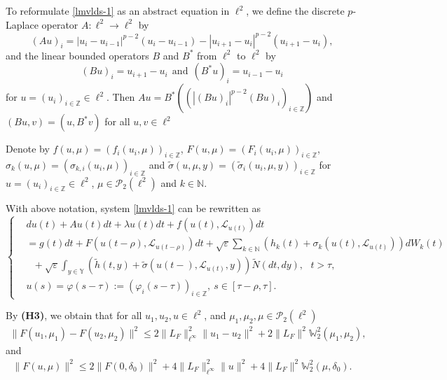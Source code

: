 \documentclass[11pt]{article}
\numberwithin{equation}{section}
\theoremstyle{plain}
\begin{document}
 To reformulate \eqref{lmvlds-1} as an abstract equation in $\ell^2$,
  we  define the discrete $p$-Laplace operator $A: \ell^2 \to \ell^2 $ by
 $$ (Au)_i = |u_{i}  - u_{i-1}|^{p-2} \left( u_{i}  - u_{i-1} \right)
             - |u_{i+1} - u_{i}|^{p-2} \left( u_{i+1}  - u_i \right),
 $$
  and the  linear  bounded operators $B$ and $B^*$ from $\ell^2$ to $\ell^2 $ by
 $$(Bu)_i = u_{i+1} - u_i \ \ \text{and}\ \  (B^*u)_i = u_{i-1} - u_{i}$$
 for $u=(u_i)_{i \in \mathbb{Z} } \in \ell^2$.
 Then
 $ Au= B^*
                        \left( \left( |(Bu)_i|^{p-2} (Bu)_i \right)_{i \in \mathbb{Z}}
                        \right)
 $
 and
 $(Bu, v) = (u, B^*v)$
 for all $u,v \in \ell^2$

 Denote by
 $f(u,\mu) = (f_i(u_i, \mu ))_{i \in \mathbb{Z}}$,
 $F(u,\mu) = (F_i(u_i, \mu))_{i \in \mathbb{Z}}$,
 $\sigma_k(u, \mu) = (\sigma_{k,i}(u_i, \mu))_{i \in \mathbb{Z}}$
 and
 $\widetilde{\sigma} (u, \mu, y) = (\widetilde{\sigma}_{i}(u_i, \mu, y))_{i \in \mathbb{Z}}$
 for $u = (u_i)_{i \in \mathbb{Z}} \in \ell^2$,
       $\mu \in \mathcal{P}_2(\ell^2)$
 and $k \in \mathbb{N}$.

With  above notation, system \eqref{lmvlds-1} can be rewritten as
\begin{equation}\label{lmvlds-2}
  \left\{
    \begin{aligned}
       & d u (t)
         + Au(t) dt
         + \lambda u(t) dt
         + f(u(t),\mathcal{L}_{u(t)}) dt \\
       & = g(t) dt
           + F( u(t - \rho), \mathcal{L}_{u(t - \rho)} ) dt
           + \sqrt{\varepsilon}\sum_{k \in \mathbb{N} }
              \left( h_k(t) + \sigma_k(u(t), \mathcal{L}_{u(t)}) \right) dW_k(t)  \\
       & \ \ \
           + \sqrt{\varepsilon}
            \int_{y\in \mathbb{Y}}
                \left( \widetilde{h}(t,y) + \widetilde{\sigma}
                (u(t-), \mathcal{L}_{u(t)}, y)
                \right) \widetilde{N}(dt,dy), \ \ \ t > \tau, \\
       & u(s) = \varphi(s-\tau) := ( \varphi_i(s-\tau) )_{i \in \mathbb{Z}} ,\  s \in  [\tau-\rho, \tau].
    \end{aligned}
  \right.
\end{equation}



 By {\bf(H3)}, we obtain that for all $ u_1, u_2, u \in \ell^2$, and $ \mu_1, \mu_2, \mu \in \mathcal{P}_2(\ell^2) $
 \begin{align}\label{F2}
    \| F(u_1,\mu_1) - F(u_2,\mu_2) \|^2
    \le 2 \|L_{F}\|_{\ell^\infty}^2 \|u_1 - u_2\|^2
         + 2 \|L_{F}\|^2\mathbb{W}_2^2(\mu_1,\mu_2),
 \end{align}
 and
 \begin{align}\label{F3}
    \|F(u,\mu)\|^2
    \le 2 \|F(0,\delta_0)\|^2
            + 4 \|L_{F}\|_{\ell^\infty}^2 \|u\|^2
            + 4 \|L_{F}\|^2 \mathbb{W}_2^2(\mu,\delta_0).
 \end{align}
\end{document}
